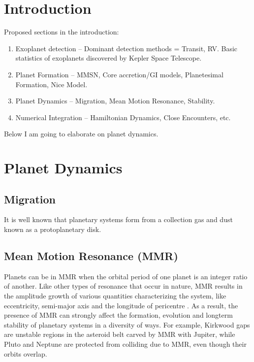 \documentclass[12pt,letter]{aastex}
\date{Draft version: \today}
\begin{document}
\section{Introduction}

Proposed sections in the introduction:
\begin{enumerate}
\item Exoplanet detection -- Dominant detection methods = Transit, RV. Basic statistics of exoplanets discovered by Kepler Space Telescope. 
\item Planet Formation -- MMSN, Core accretion/GI models, Planetesimal Formation, Nice Model. 
\item Planet Dynamics -- Migration, Mean Motion Resonance, Stability.
\item Numerical Integration -- Hamiltonian Dynamics, Close Encounters, etc. 
\end{enumerate}

Below I am going to elaborate on planet dynamics. 

\section{Planet Dynamics}
\subsection{Migration}
It is well known that planetary systems form from a collection gas and dust known as a protoplanetary disk. 


\subsection{Mean Motion Resonance (MMR)}
Planets can be in MMR when the orbital period of one planet is an integer ratio of another. 
Like other types of resonance that occur in nature, MMR results in the amplitude growth of various quantities characterizing the system, like eccentricity, semi-major axis and the longitude of pericentre \citep{SSD1999}. 
As a result, the presence of MMR can strongly affect the formation, evolution and longterm stability of planetary systems in a diversity of ways.
For example, Kirkwood gaps are unstable regions in the asteroid belt carved by MMR with Jupiter, while Pluto and Neptune are protected from colliding due to MMR, even though their orbits overlap. 
\end{document}
